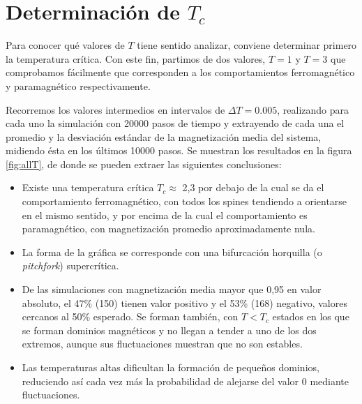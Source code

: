 \documentclass{scrartcl}
\begin{document}
\section{Determinación de $T_c$}
Para conocer qué valores de $T$ tiene sentido analizar, conviene determinar primero la temperatura crítica. Con este fin, partimos de dos valores, $T=1$ y $T=3$ que comprobamos fácilmente que corresponden a los comportamientos ferromagnético y paramagnético respectivamente.\par
Recorremos los valores intermedios en intervalos de $\Delta T = 0.005$, realizando para cada uno la simulación con 20000 pasos de tiempo y extrayendo de cada una el promedio y la desviación estándar de la magnetización media del sistema, midiendo ésta en los últimos 10000 pasos. Se muestran los resultados en la figura \ref{fig:allT}, de donde se pueden extraer las siguientes conclusiones:\par
\begin{itemize}
\item Existe una temperatura crítica $T_c \approx$ 2,3 por debajo de la cual se da el comportamiento ferromagnético, con todos los spines tendiendo a orientarse en el mismo sentido, y por encima de la cual el comportamiento es paramagnético, con magnetización promedio aproximadamente nula.
\item La forma de la gráfica se corresponde con una bifurcación horquilla (o \textit{pitchfork}) supercrítica.
\item De las simulaciones con magnetización media mayor que 0,95 en valor absoluto, el 47\% (150) tienen valor positivo y el 53\% (168) negativo, valores cercanos al 50\% esperado. Se forman también, con $T<T_c$ estados en los que se forman dominios magnéticos y no llegan a tender a uno de los dos extremos, aunque sus fluctuaciones muestran que no son estables.
\item Las temperaturas altas dificultan la formación de pequeños dominios, reduciendo así cada vez más la probabilidad de alejarse del valor 0 mediante fluctuaciones.
\end{itemize}
\end{document}
